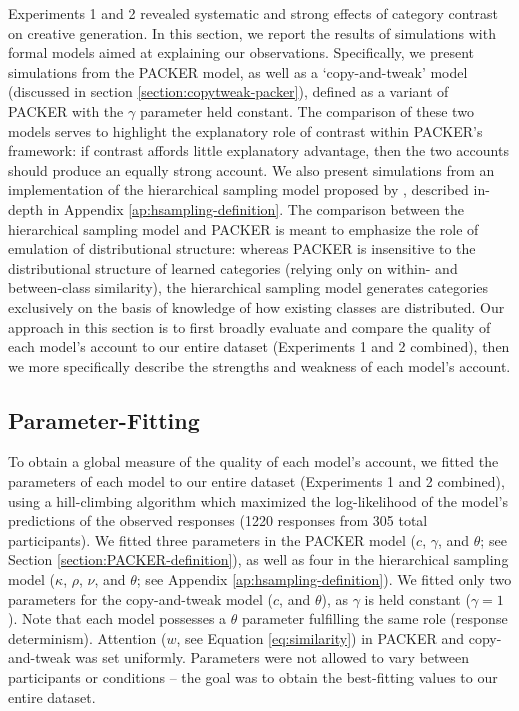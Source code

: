\documentclass[12pt]{article}
\begin{document}
\begin{flushleft}
Experiments 1 and 2 revealed systematic and strong effects of category contrast on creative generation. In this section, we report the results of simulations with formal models aimed at explaining our observations. Specifically, we present simulations from the PACKER model, as well as a `copy-and-tweak' model (discussed in section \ref{section:copytweak-packer}), defined as a variant of PACKER with the $\gamma$ parameter held constant. The comparison of these two models serves to highlight the explanatory role of contrast within PACKER's framework: if contrast affords little explanatory advantage, then the two accounts should produce an equally strong account. We also present simulations from an implementation of the hierarchical sampling model proposed by \cite{jern2013probabilistic}, described in-depth in Appendix \ref{ap:hsampling-definition}. The comparison between the hierarchical sampling model and PACKER is meant to emphasize the role of emulation of distributional structure: whereas PACKER is insensitive to the distributional structure of learned categories (relying only on within- and between-class similarity), the hierarchical sampling model generates categories exclusively on the basis of knowledge of how existing classes are distributed. Our approach in this section is to first broadly evaluate and compare the quality of each model's account to our entire dataset (Experiments 1 and 2 combined), then we more specifically describe the strengths and weakness of each model's account.

\subsection{Parameter-Fitting}

To obtain a global measure of the quality of each model's account, we fitted the parameters of each model to our entire dataset (Experiments 1 and 2 combined), using a hill-climbing algorithm which maximized the log-likelihood of the model's predictions of the observed responses (1220 responses from 305 total participants). We fitted three parameters in the PACKER model ($c$, $\gamma$, and $\theta$; see Section \ref{section:PACKER-definition}), as well as four in the hierarchical sampling model ($\kappa$, $\rho$, $\nu$, and $\theta$; see Appendix \ref{ap:hsampling-definition}). We fitted only two parameters for the copy-and-tweak model ($c$, and $\theta$), as $\gamma$ is held constant ($\gamma = 1$). Note that each model possesses a $\theta$ parameter fulfilling the same role (response determinism). Attention ($w$, see Equation \ref{eq:similarity}) in PACKER and copy-and-tweak was set uniformly. Parameters were not allowed to vary between participants or conditions -- the goal was to obtain the best-fitting values to our entire dataset.


\end{flushleft}
\end{document}
